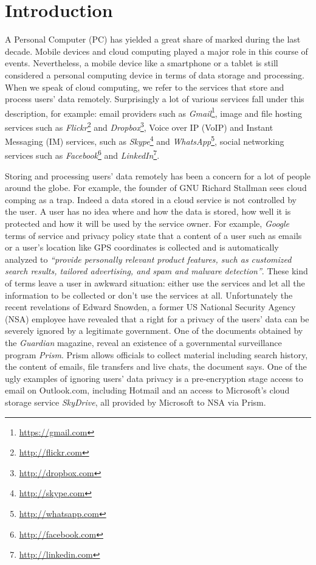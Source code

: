 \section{Introduction}

A Personal Computer (PC) has yielded a great share of marked during the
last decade. Mobile devices and cloud computing played a major role in
this course of events. Nevertheless, a mobile device like a smartphone or a
tablet is still considered a personal computing device in terms of data
storage and processing. When we speak of cloud computing, we refer to
the services that store and process users' data remotely.
Surprisingly a lot of various services fall under this description,
for example: email providers such as
\emph{Gmail}\footnote{\url{https://gmail.com}},
image and file hosting services such as
\emph{Flickr}\footnote{\url{http://flickr.com}} and
\emph{Dropbox}\footnote{\url{http://dropbox.com}},
Voice over IP (VoIP) and Instant Messaging (IM) services, such as
\emph{Skype}\footnote{\url{http://skype.com}} and
\emph{WhatsApp}\footnote{\url{http://whatsapp.com}},
social networking services such as
\emph{Facebook}\footnote{\url{http://facebook.com}} and
\emph{LinkedIn}\footnote{\url{http://linkedin.com}}.

Storing and processing users' data remotely has been a concern for
a lot of people around the globe. For example, the founder of GNU
Richard Stallman sees cloud comping as a trap\cite{stallman-cloud-08}.
Indeed a data stored in a cloud service is not controlled by the user.
A user has no idea where and how the data is stored, how well it is
protected and how it will be used by the service owner.
For example, \emph{Google} terms of service\cite{google-tos} and
privacy policy\cite{google-privacy} state that a content of a user
such as emails or a user's location like GPS coordinates is collected
and is automatically analyzed to
\emph{``provide personally relevant product
features, such as customized search results, tailored advertising,
and spam and malware detection''}.
These kind of terms leave a user
in awkward situation: either use the services and let all the information
to be collected or don't use the services at all.
Unfortunately the recent revelations\cite{snowden-timeline}
of Edward Snowden, a former US National Security Agency (NSA) employee
have revealed that a right for a privacy of the users' data can be
severely ignored by a legitimate government.
One of the documents obtained by the \emph{Guardian} magazine,
reveal an existence of a governmental surveillance program
\emph{Prism}\cite{snowden-prism}. Prism allows officials to collect
material including search history, the content of emails, file
transfers and live chats, the document says. One of the ugly examples
of ignoring users' data privacy is a pre-encryption stage access
to email on Outlook.com, including Hotmail and an access to Microsoft's
cloud storage service \emph{SkyDrive}, all provided by Microsoft to NSA
via Prism\cite{snowden-ms-nsa}.

